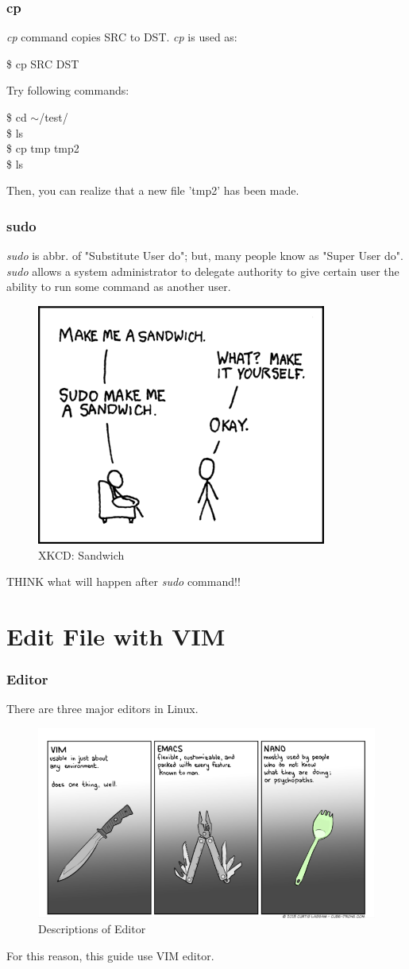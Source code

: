 \documentclass{beamer}
\begin{document}
	\begin{frame}
		\frametitle{cp}
		\textit{cp} command copies SRC to DST. \textit{cp} is used as:
		\begin{example}
			\$ cp SRC DST
		\end{example}
	
		Try following commands:
		\begin{example}
			\$ cd $\sim$/test/ \\
			\$ ls \\
			\$ cp tmp tmp2 \\
			\$ ls
		\end{example}
		Then, you can realize that a new file 'tmp2' has been made. 
	\end{frame}

	\begin{frame}
		\frametitle{sudo}
		\textit{sudo} is abbr. of "Substitute User do"; but, many people know as "Super User do". \\

		\textit{sudo} allows a system administrator to delegate authority to give certain user the ability to run some command as another user.
		
		\begin{figure}[h!]
			\centering
			\includegraphics[width=0.3 \linewidth]{figures/sudo.png}
			\caption{XKCD: Sandwich}
		\end{figure}
	
		THINK what will happen after \textit{sudo} command!!
	\end{frame}

	\section{Edit File with VIM} 
	
	\begin{frame}
		\frametitle{Editor}
		There are three major editors in Linux.
		\begin{figure}[h!]
			\centering
			\includegraphics[width=0.7 \linewidth]{figures/editor.png}
			\caption{Descriptions of Editor}
		\end{figure}
		For this reason, this guide use VIM editor. 
	\end{frame}
\end{document}
